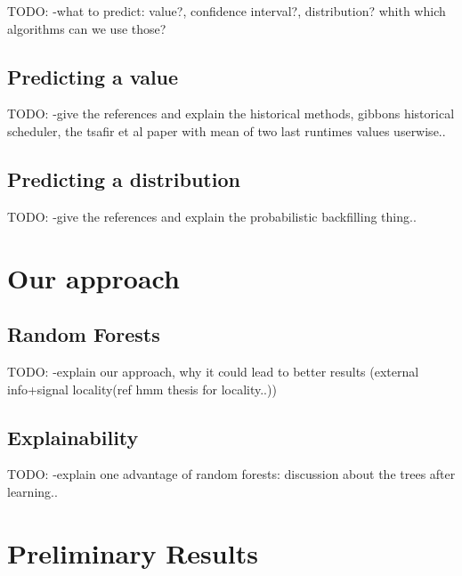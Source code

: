 \documentclass{article}
\begin{document}
TODO: -what to predict: value?, confidence interval?, distribution? whith which algorithms can we use those?


\subsection{Predicting a value}
\label{sub:predicting_a_value}

TODO: -give the references and explain the historical methods, gibbons historical scheduler, the tsafir et al paper with mean of two last runtimes values userwise..


\subsection{Predicting a distribution}
\label{sub:predicting_a_distribution}

TODO: -give the references and explain the probabilistic backfilling thing..



\section{Our approach}
\label{sec:our_approach}

\subsection{Random Forests}
\label{sub:random_forests}
TODO: -explain our approach, why it could lead to better results (external info+signal locality(ref hmm thesis for locality..))

\subsection{Explainability}
\label{sub:explainability}
TODO: -explain one advantage of random forests: discussion about the trees after learning..


\section{Preliminary Results}
\label{sec:preliminary_results}
\end{document}
